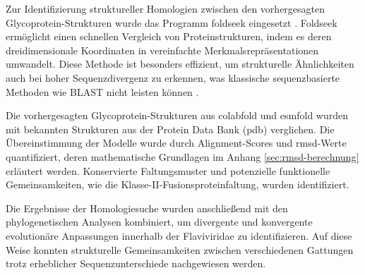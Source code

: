 Zur Identifizierung struktureller Homologien zwischen den vorhergesagten Glycoprotein-Strukturen wurde das Programm \gls{foldseek} eingesetzt \autocite{vankempenFastAccurateProtein2024}. Foldseek ermöglicht einen schnellen Vergleich von Proteinstrukturen, indem es deren dreidimensionale Koordinaten in vereinfachte Merkmalsrepräsentationen umwandelt. Diese Methode ist besonders effizient, um strukturelle Ähnlichkeiten auch bei hoher Sequenzdivergenz zu erkennen, was klassische sequenzbasierte Methoden wie BLAST nicht leisten können \autocite{Altschul1990}.

Die vorhergesagten Glycoprotein-Strukturen aus \gls{colabfold} und \gls{esmfold} wurden mit bekannten Strukturen aus der Protein Data Bank (\gls{pdb}) verglichen. Die Übereinstimmung der Modelle wurde durch Alignment-Scores und \gls{rmsd}-Werte quantifiziert, deren mathematische Grundlagen im Anhang \ref{sec:rmsd-berechnung} erläutert werden. Konservierte Faltungsmuster und potenzielle funktionelle Gemeinsamkeiten, wie die Klasse-II-Fusionsproteinfaltung, wurden identifiziert.

Die Ergebnisse der Homologiesuche wurden anschließend mit den phylogenetischen Analysen kombiniert, um divergente und konvergente evolutionäre Anpassungen innerhalb der Flaviviridae zu identifizieren. Auf diese Weise konnten strukturelle Gemeinsamkeiten zwischen verschiedenen Gattungen trotz erheblicher Sequenzunterschiede nachgewiesen werden.